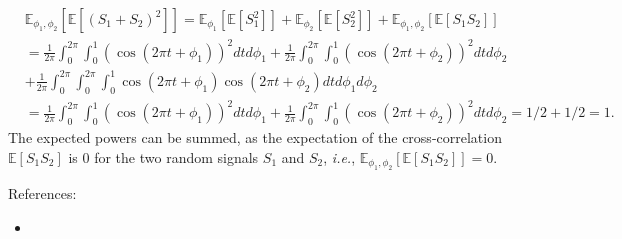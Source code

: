 \documentclass{article}
\begin{document}
\begin{align*}
  &\mathbb{E}_{\phi_1,\phi_2} \left[\mathbb{E}[(S_1 + S_2)^2]\right] = \mathbb{E}_{\phi_1} \left[\mathbb{E}\left[ S_1^2\right]\right] + \mathbb{E}_{\phi_2} \left[\mathbb{E}\left[ S_2^2\right]\right] +\mathbb{E}_{\phi_1,\phi_2} \left[\mathbb{E}\left[ S_1S_2\right]\right] \\
  &=\frac{1}{2 \pi}\int_0^{2 \pi} \int_0^1 (\cos(2 \pi t + \phi_1))^2dt d \phi_1 + \frac{1}{2 \pi}\int_0^{2 \pi} \int_0^1 ( \cos(2 \pi t + \phi_2))^2dt  d \phi_2 \\
  &  + \frac{1}{2 \pi}\int_0^{2 \pi} \int_0^{2 \pi}\int_0^1 \cos(2 \pi t + \phi_1) \cos(2 \pi t + \phi_2)dt d \phi_1 d \phi_2\\
  &= \frac{1}{2 \pi}\int_0^{2 \pi} \int_0^1 (\cos(2 \pi t + \phi_1))^2dt d \phi_1  + \frac{1}{2 \pi}\int_0^{2 \pi} \int_0^1 ( \cos(2 \pi t + \phi_2))^2dt  d \phi_2 = 1/2 +1/2 =1.
\end{align*}
The expected powers can be summed, as the expectation of the cross-correlation $\mathbb{E}[S_1 S_2]$ is $0$ for the two random signals $S_1$ and $S_2$, \textit{i.e.}, $\mathbb{E}_{\phi_1,\phi_2} \left[\mathbb{E}\left[ S_1S_2\right]\right] =0$.


References:
\begin{itemize}
\item {} 
\end{itemize}





\end{document}
